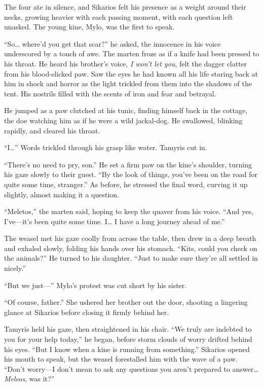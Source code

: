 The four ate in silence, and Sikarios felt his presence as a weight around their necks, growing heavier with each passing moment, with each question left unasked. The young kine, Mylo, was the first to speak.

``So\ldots{} where'd you get that scar?'' he asked, the innocence in his voice underscored by a touch of awe. The marten froze as if a knife had been pressed to his throat. He heard his brother's voice, \emph{I won't let you}, felt the dagger clatter from his blood-slicked paw. Saw the eyes he had known all his life staring back at him in shock and horror as the light trickled from them into the shadows of the tent. His nostrils filled with the scents of iron and fear and betrayal.

He jumped as a paw clutched at his tunic, finding himself back in the cottage, the doe watching him as if he were a wild jackal-dog. He swallowed, blinking rapidly, and cleared his throat.

``I\ldots'' Words trickled through his grasp like water. Tamyris cut in.

``There's no need to pry, son.'' He set a firm paw on the kine's shoulder, turning his gaze slowly to their guest. ``By the look of things, you've been on the road for quite some time, stranger.'' As before, he stressed the final word, curving it up slightly, almost making it a question.

``Meletos,'' the marten said, hoping to keep the quaver from his voice. ``And yes, I've---it's been quite some time. I\ldots{} I have a long journey ahead of me.''

The weasel met his gaze coolly from across the table, then drew in a deep breath and exhaled slowly, folding his hands over his stomach. ``Kits, could you check on the animals?'' He turned to his daughter. ``Just to make sure they're all settled in nicely.''

``But we just---'' Mylo's protest was cut short by his sister.

``Of course, father.'' She ushered her brother out the door, shooting a lingering glance at Sikarios before closing it firmly behind her.

Tamyris held his gaze, then straightened in his chair. ``We truly are indebted to you for your help today,'' he began, before storm clouds of worry drifted behind his eyes. ``But I know when a kine is running from something.'' Sikarios opened his mouth to speak, but the weasel forestalled him with the wave of a paw. ``Don't worry---I don't mean to ask any questions you aren't prepared to answer\ldots{}\emph{Meleos}, was it?''

